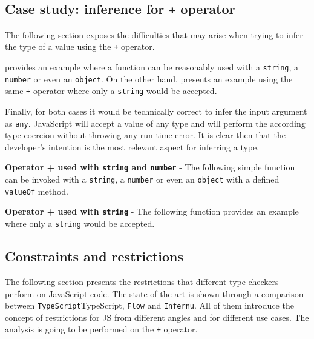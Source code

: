 \subsection{Case study: inference for \texttt{+} operator}

The following section exposes the difficulties that may arise when trying to infer the type of a value using the \texttt{+} operator.

 provides an example where a function can be reasonably used with a \texttt{string}, a \texttt{number} or even an \texttt{object}. On the other hand,  presents an example using the same \texttt{+} operator where only a \texttt{string} would be accepted.

Finally, for both cases it would be technically correct to infer the input argument as \texttt{any}. JavaScript will accept a value of any type and will perform the according type coercion without throwing any run-time error. It is clear then that the developer's intention is the most relevant aspect for inferring a type.

\begin{code}
  \captionsetup{aboveskip=0pt, belowskip=10pt}
  \caption[Operator + used with string and number]{\textbf{Operator + used with \texttt{string} and \texttt{number}} - The following simple function can be invoked with a \texttt{string}, a \texttt{number} or even an \texttt{object} with a defined \texttt{valueOf} method.}
  \label{code:type-inference-string-concatenation}
\end{code}

\begin{code}
  \captionsetup{aboveskip=0pt, belowskip=10pt}
  \caption[Operator + used only with string]{\textbf{Operator + used with \texttt{string}} - The following function provides an example where only a \texttt{string} would be accepted.}
  \label{code:type-inference-string-concatenation-only-string}
\end{code}

\subsection{Constraints and restrictions}
The following section presents the restrictions that different type checkers perform on JavaScript code. The state of the art is shown through a comparison between \texttt{TypeScript}{TypeScript}, \texttt{Flow} and \texttt{Infernu}. All of them introduce the concept of restrictions for JS from different angles and for different use cases. The analysis is going to be performed on the \texttt{+} operator.

